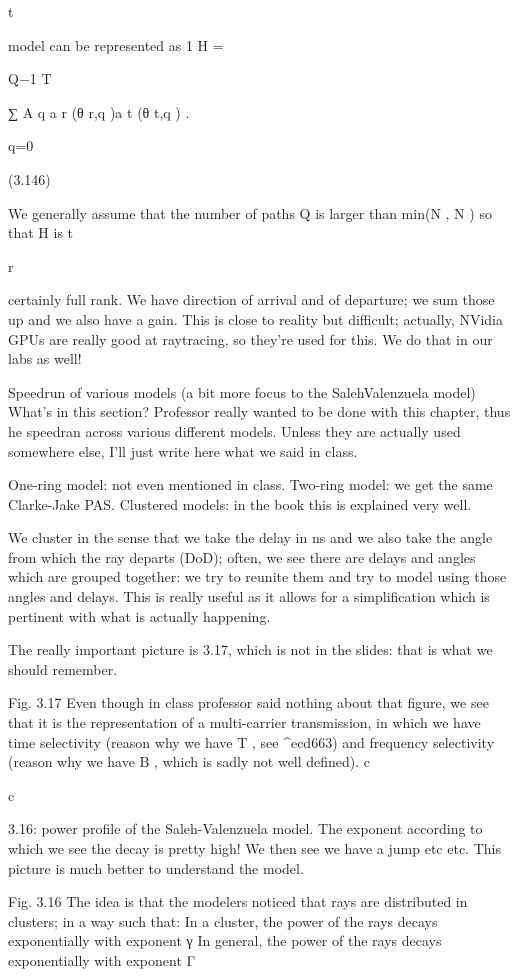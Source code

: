 {{{{t

model can be represented as 1 H =

Q−1 T

∑ A q a r (θ r,q )a t (θ t,q ) .
\sqrtQ

q=0

(3.146)

We generally assume that the number of paths Q is larger than min(N , N ) so that H is t

r

certainly full rank.
We have direction of arrival and of departure; we sum those up and we also have a gain.
This is close to reality but difficult; actually, NVidia GPUs are really good at raytracing, so they're used for this. We do that in our labs as well!

Speedrun of various models (a bit more focus to the SalehValenzuela model)
​What's in this section?
Professor really wanted to be done with this chapter, thus he speedran across various different models. Unless they are actually used somewhere else, I'll just write here what we said in class.

One-ring model: not even mentioned in class.
Two-ring model: we get the same Clarke-Jake PAS.
Clustered models: in the book this is explained very well.

We cluster in the sense that we take the delay in ns and we also take the angle from which the ray departs (DoD); often, we see there are delays and angles which are grouped together: we try to reunite them and try to model using those angles and delays.
This is really useful as it allows for a simplification which is pertinent with what is actually happening.

The really important picture is 3.17, which is not in the slides: that is what we should remember.

Fig. 3.17 Even though in class professor said nothing about that figure, we see that it is the representation of a multi-carrier transmission, in which we have time selectivity (reason why we have T , see ^ecd663) and frequency selectivity (reason why we have B , which is sadly not well defined).
c

c

3.16: power profile of the Saleh-Valenzuela model. The exponent according to which we see the decay is pretty high! We then see we have a jump etc etc.
This picture is much better to understand the model.

Fig. 3.16 The idea is that the modelers noticed that rays are distributed in clusters; in a way such that:
In a cluster, the power of the rays decays exponentially with exponent γ In general, the power of the rays decays exponentially with exponent Γ

}}}}
